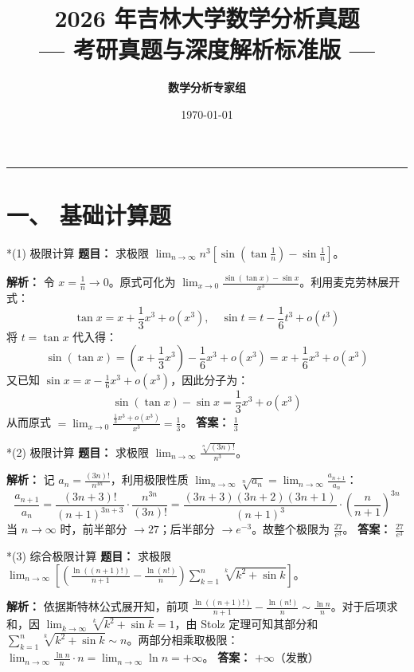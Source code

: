 \documentclass[11pt,a4paper]{article}
\title{\vspace{-1.0cm}\Huge\textbf{2026 年吉林大学数学分析真题}\\[0.3em]\large --- 考研真题与深度解析标准版 ---}
\author{\textbf{数学分析专家组}}
\date{\today}
\begin{document}
	
	\maketitle
	
	\begin{center}
		\rule{\textwidth}{0.8pt}
	\end{center}
	
	\section{一、 基础计算题}
	
	\begin{subsection}*{(1) 极限计算}
		\textbf{题目：} 求极限 $\lim_{n \to \infty} n^3 \left[ \sin\left(\tan\frac{1}{n}\right) - \sin\frac{1}{n} \right]$。
		
		\textbf{解析：} 令 $x = \frac{1}{n} \to 0$。原式可化为 $\lim_{x \to 0} \frac{\sin(\tan x) - \sin x}{x^3}$。利用麦克劳林展开式：
		$$ \tan x = x + \frac{1}{3}x^3 + o(x^3), \quad \sin t = t - \frac{1}{6}t^3 + o(t^3) $$
		将 $t = \tan x$ 代入得：
		$$ \sin(\tan x) = \left(x + \frac{1}{3}x^3\right) - \frac{1}{6}x^3 + o(x^3) = x + \frac{1}{6}x^3 + o(x^3) $$
		又已知 $\sin x = x - \frac{1}{6}x^3 + o(x^3)$，因此分子为：
		$$ \sin(\tan x) - \sin x = \frac{1}{3}x^3 + o(x^3) $$
		从而原式 $= \lim_{x \to 0} \frac{\frac{1}{3}x^3 + o(x^3)}{x^3} = \frac{1}{3}$。
		\textbf{答案：} $\frac{1}{3}$
	\end{subsection}
	
	\vspace{0.3cm}
	\begin{subsection}*{(2) 极限计算}
		\textbf{题目：} 求极限 $\lim_{n \to \infty} \frac{\sqrt[n]{(3n)!}}{n^3}$。
		
		\textbf{解析：} 记 $a_n = \frac{(3n)!}{n^{3n}}$，利用极限性质 $\lim_{n \to \infty} \sqrt[n]{a_n} = \lim_{n \to \infty} \frac{a_{n+1}}{a_n}$：
		$$ \frac{a_{n+1}}{a_n} = \frac{(3n+3)!}{(n+1)^{3n+3}} \cdot \frac{n^{3n}}{(3n)!} = \frac{(3n+3)(3n+2)(3n+1)}{(n+1)^3} \cdot \left( \frac{n}{n+1} \right)^{3n} $$
		当 $n \to \infty$ 时，前半部分 $\to 27$；后半部分 $\to e^{-3}$。故整个极限为 $\frac{27}{e^3}$。
		\textbf{答案：} $\frac{27}{e^3}$
	\end{subsection}
	
	\vspace{0.3cm}
	\begin{subsection}*{(3) 综合极限计算}
		\textbf{题目：} 求极限 $\lim_{n \to \infty} \left[ \left( \frac{\ln((n+1)!)}{n+1} - \frac{\ln(n!)}{n} \right) \sum_{k=1}^n \sqrt[k]{k^2 + \sin k} \right]$。
		
		\textbf{解析：} 依据斯特林公式展开知，前项 $\frac{\ln((n+1)!)}{n+1} - \frac{\ln(n!)}{n} \sim \frac{\ln n}{n}$。对于后项求和，因 $\lim_{k\to\infty}\sqrt[k]{k^2+\sin k} = 1$，由 Stolz 定理可知其部分和 $\sum_{k=1}^n \sqrt[k]{k^2 + \sin k} \sim n$。两部分相乘取极限：$\lim_{n \to \infty} \frac{\ln n}{n} \cdot n = \lim_{n \to \infty} \ln n = +\infty$。
		\textbf{答案：} $+\infty$（发散）
	\end{subsection}
	
\end{document}
